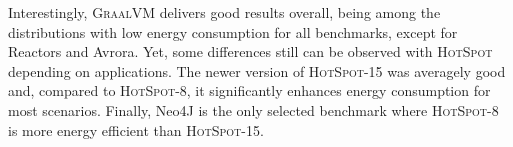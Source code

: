 Interestingly, \textsc{GraalVM} delivers good results overall, being among the distributions with low energy consumption for all benchmarks, except for \textsf{Reactors} and \textsf{Avrora}.
Yet, some differences still can be observed with \textsc{HotSpot} depending on applications.
The newer version of \textsc{HotSpot-15} was averagely good and, compared to \textsc{HotSpot-8}, it significantly enhances energy consumption for most scenarios.
Finally, \textsf{Neo4J} is the only selected benchmark where \textsc{HotSpot-8} is more energy efficient than \textsc{HotSpot-15}.





